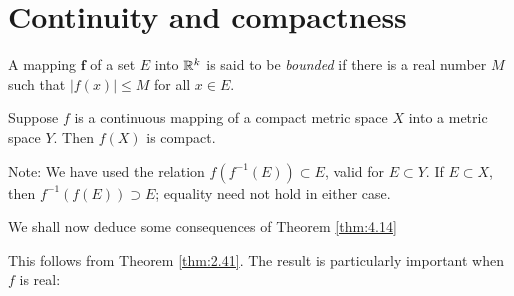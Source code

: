 
\section{Continuity and compactness}
\begin{myDef}
    \label{myDef:4.13}
    A mapping $\mathbf{f}$ of a set $E$ into ${\protect\mathbb R}^{k}$ is said to be \emph{bounded} 
    if there is a real number $M$ such that $\left| f(x) \right| \leq M$ for all $x \in E$.
\end{myDef}
\begin{thm}
    \label{thm:4.14}
    Suppose $f$ is a continuous mapping of a compact metric space $X$ into a metric space $Y$. Then $f(X)$ is compact.
\end{thm}

Note: We have used the relation $f(f^{- 1}(E)) \subset E$, valid for $E \subset Y$. 
If $E \subset X$, then $f^{- 1}(f(E)) \supset E$; equality need not hold in either case.

We shall now deduce some consequences of Theorem \ref{thm:4.14}


This follows from Theorem \ref{thm:2.41}. 
The result is particularly important when $f$ is real:

